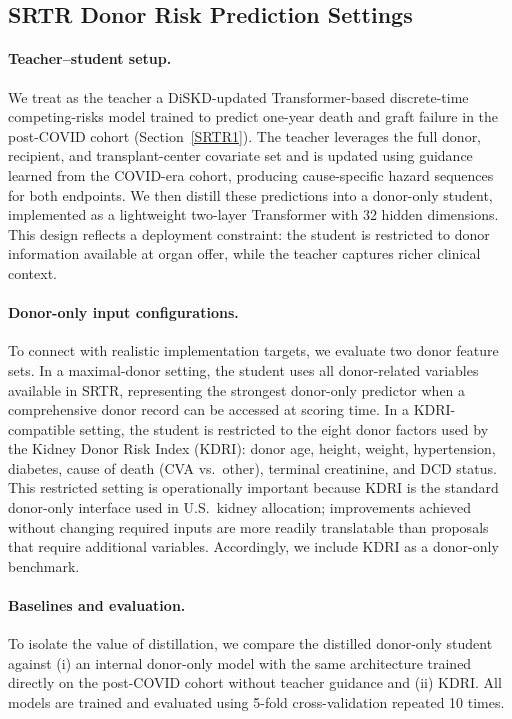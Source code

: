 \documentclass{article}
\theoremstyle{plain}
\theoremstyle{definition}
\theoremstyle{remark}
\begin{document}
\subsection{SRTR Donor Risk Prediction Settings}
\label{A.SRTRSettings2}
\paragraph{Teacher--student setup.}
We treat as the teacher a DiSKD-updated Transformer-based discrete-time competing-risks model trained to predict one-year death and graft failure in the post-COVID cohort (Section~\ref{SRTR1}).
The teacher leverages the full donor, recipient, and transplant-center covariate set and is updated using guidance learned from the COVID-era cohort, producing cause-specific hazard sequences for both endpoints.
We then distill these predictions into a donor-only student, implemented as a lightweight two-layer Transformer with 32 hidden dimensions.
This design reflects a deployment constraint: the student is restricted to donor information available at organ offer, while the teacher captures richer clinical context.


\paragraph{Donor-only input configurations.}
To connect with realistic implementation targets, we evaluate two donor feature sets.
In a maximal-donor setting, the student uses all donor-related variables available in SRTR, representing the strongest donor-only predictor when a comprehensive donor record can be accessed at scoring time.
In a KDRI-compatible setting, the student is restricted to the eight donor factors used by the Kidney Donor Risk Index (KDRI): donor age, height, weight, hypertension, diabetes, cause of death (CVA vs.\ other), terminal creatinine, and DCD status.
This restricted setting is operationally important because KDRI is the standard donor-only interface used in U.S.\ kidney allocation; improvements achieved without changing required inputs are more readily translatable than proposals that require additional variables.
Accordingly, we include KDRI as a donor-only benchmark.


\paragraph{Baselines and evaluation.}
To isolate the value of distillation, we compare the distilled donor-only student against (i) an internal donor-only model with the same architecture trained directly on the post-COVID cohort without teacher guidance and (ii) KDRI.
All models are trained and evaluated using 5-fold cross-validation repeated 10 times.
\end{document}
